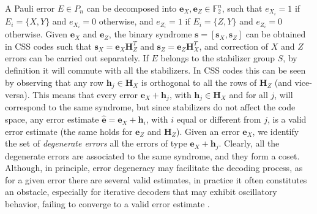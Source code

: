 \documentclass[a4paper,twocolumn,11pt,accepted=2026-05-03]{quantumarticle}
\begin{document}
A Pauli error $E \in P_n$ can be decomposed into $\mathbf{e}_X,\mathbf{e}_Z \in \mathbb{F}_2^n$, such that $e_{X_i}=1$ if $E_i=\{X,Y\}$ and $e_{X_i}=0$ otherwise, and $e_{Z_i}=1$ if $E_i=\{Z,Y\}$ and $e_{Z_i}=0$ otherwise. Given $\mathbf{e}_X$ and $\mathbf{e}_Z$, the binary syndrome $\mathbf{s} = [\mathbf{s}_X, \mathbf{s}_Z]$ can be obtained in CSS codes such that $\mathbf{s}_X = \mathbf{e}_X\mathbf{H}_Z^T$ and $\mathbf{s}_Z = \mathbf{e}_Z\mathbf{H}_X^T$, and correction of $X$ and $Z$ errors can be carried out separately. 
If $E$ belongs to the stabilizer group $S$, by definition it will commute with all the stabilizers. In CSS codes this can be seen by observing that any row $\mathbf{h}_j \in \mathbf{H}_X$ is orthogonal to all the rows of $\mathbf{H}_Z$ (and vice-versa). This means that every error $\mathbf{e}_X + \mathbf{h}_j$, with $\mathbf{h}_j \in \mathbf{H}_X$ and for all $j$, will correspond to the same syndrome, but since stabilizers do not affect the code space, any error estimate $\hat{\mathbf{e}} = \mathbf{e}_X + \mathbf{h}_i$, with $i$ equal or different from $j$, is a valid error estimate (the same holds for $\mathbf{e}_Z$ and $\mathbf{H}_Z$). Given an error $\mathbf{e}_X$, we identify the set of \textit{degenerate errors} all the errors of type $\mathbf{e}_X + \mathbf{h}_j$. Clearly, all the degenerate errors are associated to the same syndrome, and they form a coset. Although, in principle, error degeneracy may facilitate the decoding process, as for a given error there are several valid estimates, in practice it often constitutes an obstacle, especially for iterative decoders that may exhibit oscillatory behavior, failing to converge to a valid error estimate \cite{chytas2025enhancedminsumdecodingquantum,chytas_enhanced_2024,chytas2024collectivebitflippingbaseddecoding}.
\end{document}
